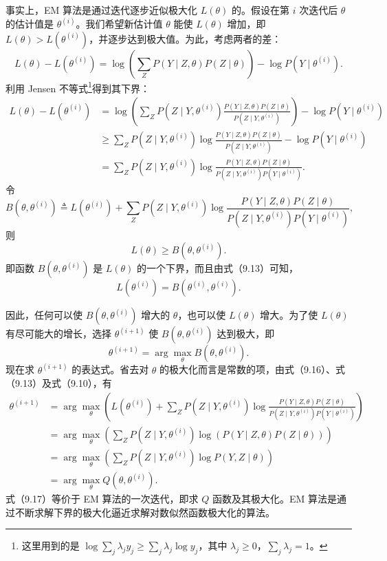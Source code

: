 \documentclass[UTF8,12pt,a4paper,fontset=fandol]{ctexart}
\begin{document}
事实上，EM 算法是通过迭代逐步近似极大化 $L(\theta)$ 的。假设在第 $i$ 次迭代后 $\theta$ 的估计值是 $\theta^{(i)}$。我们希望新估计值 $\theta$ 能使 $L(\theta)$ 增加，即 $L(\theta)>L(\theta^{(i)})$，并逐步达到极大值。为此，考虑两者的差：
\[
  L(\theta)-L(\theta^{(i)})
  =\log\left(\sum_Z P(Y\mid Z,\theta)P(Z\mid\theta)\right)-\log P(Y\mid\theta^{(i)}).
\]
利用 Jensen 不等式\footnote{这里用到的是 $\log\sum_j \lambda_j y_j\geq \sum_j\lambda_j\log y_j$，其中 $\lambda_j\geq0$，$\sum_j\lambda_j=1$。}得到其下界：
\[
\begin{aligned}
  L(\theta)-L(\theta^{(i)})
  &=\log\left(\sum_Z P(Z\mid Y,\theta^{(i)})
  \frac{P(Y\mid Z,\theta)P(Z\mid\theta)}{P(Z\mid Y,\theta^{(i)})}\right)
  -\log P(Y\mid\theta^{(i)}) \\
  &\geq \sum_Z P(Z\mid Y,\theta^{(i)})
  \log\frac{P(Y\mid Z,\theta)P(Z\mid\theta)}
  {P(Z\mid Y,\theta^{(i)})}
  -\log P(Y\mid\theta^{(i)}) \\
  &=\sum_Z P(Z\mid Y,\theta^{(i)})
  \log\frac{P(Y\mid Z,\theta)P(Z\mid\theta)}
  {P(Z\mid Y,\theta^{(i)})P(Y\mid\theta^{(i)})}.
\end{aligned}
\]
令
\begin{equation}
  B(\theta,\theta^{(i)})\triangleq L(\theta^{(i)})+
  \sum_Z P(Z\mid Y,\theta^{(i)})
  \log\frac{P(Y\mid Z,\theta)P(Z\mid\theta)}
  {P(Z\mid Y,\theta^{(i)})P(Y\mid\theta^{(i)})},
  \tag{9.13}
\end{equation}
则
\begin{equation}
  L(\theta)\geq B(\theta,\theta^{(i)}).
  \tag{9.14}
\end{equation}
即函数 $B(\theta,\theta^{(i)})$ 是 $L(\theta)$ 的一个下界，而且由式（9.13）可知，
\begin{equation}
  L(\theta^{(i)})=B(\theta^{(i)},\theta^{(i)}).
  \tag{9.15}
\end{equation}

因此，任何可以使 $B(\theta,\theta^{(i)})$ 增大的 $\theta$，也可以使 $L(\theta)$ 增大。为了使 $L(\theta)$ 有尽可能大的增长，选择 $\theta^{(i+1)}$ 使 $B(\theta,\theta^{(i)})$ 达到极大，即
\begin{equation}
  \theta^{(i+1)}=\arg\max_{\theta}B(\theta,\theta^{(i)}).
  \tag{9.16}
\end{equation}
现在求 $\theta^{(i+1)}$ 的表达式。省去对 $\theta$ 的极大化而言是常数的项，由式（9.16）、式（9.13）及式（9.10），有
\begin{equation}
\begin{aligned}
  \theta^{(i+1)}
  &=\arg\max_{\theta}\left(
  L(\theta^{(i)})+\sum_Z P(Z\mid Y,\theta^{(i)})
  \log\frac{P(Y\mid Z,\theta)P(Z\mid\theta)}
  {P(Z\mid Y,\theta^{(i)})P(Y\mid\theta^{(i)})}\right)\\
  &=\arg\max_{\theta}\left(
  \sum_Z P(Z\mid Y,\theta^{(i)})
  \log(P(Y\mid Z,\theta)P(Z\mid\theta))\right)\\
  &=\arg\max_{\theta}\left(
  \sum_Z P(Z\mid Y,\theta^{(i)})\log P(Y,Z\mid\theta)\right)\\
  &=\arg\max_{\theta}Q(\theta,\theta^{(i)}).
\end{aligned}
  \tag{9.17}
\end{equation}
式（9.17）等价于 EM 算法的一次迭代，即求 $Q$ 函数及其极大化。EM 算法是通过不断求解下界的极大化逼近求解对数似然函数极大化的算法。
\end{document}
